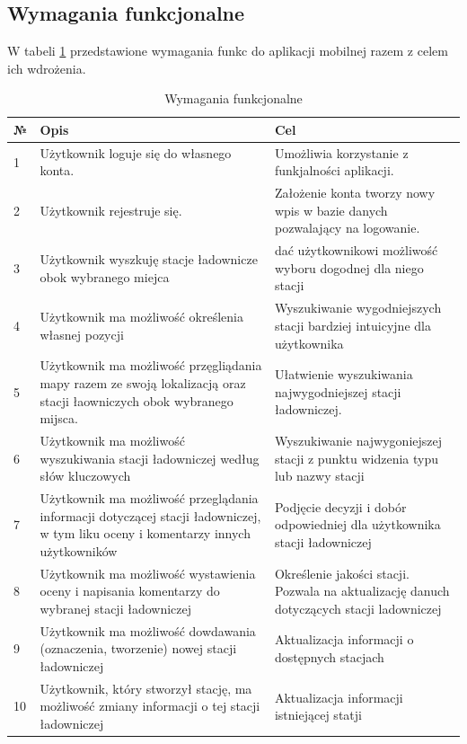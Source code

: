 \subsection{Wymagania funkcjonalne}
W tabeli \ref{tab:wymaganiafunkcjonalne} przedstawione wymagania funkc do aplikacji mobilnej razem z celem ich wdrożenia.
\begin{table}[htb] \small
    \caption{Wymagania funkcjonalne}
    \label{tab:wymaganiafunkcjonalne}
    \begin{tabular}{| m{0.5cm} | m{7cm} | m{7cm} |} 
    \hline
    № & Opis & Cel \\
    \hline
    1 & Użytkownik loguje się do własnego konta. & Umożliwia korzystanie z funkjalności aplikacji. \\ 
    \hline
    2 & Użytkownik rejestruje się. & Założenie konta tworzy nowy wpis w bazie danych pozwalający na logowanie. \\ 
    \hline
    3 & Użytkownik wyszkuję stacje ładownicze obok wybranego miejca  & dać użytkownikowi możliwość wyboru dogodnej dla niego stacji \\
    \hline
    4 & Użytkownik ma możliwość określenia własnej pozycji & Wyszukiwanie wygodniejszych stacji bardziej intuicyjne dla użytkownika  \\
    \hline
    5 & Użytkownik ma możliwość przęgliądania mapy razem ze swoją lokalizacją oraz stacji łaowniczych obok wybranego mijsca. & Ułatwienie wyszukiwania najwygodniejszej stacji ładowniczej. \\
    \hline
    6 & Użytkownik ma możliwość wyszukiwania stacji ładowniczej według słów kluczowych & Wyszukiwanie najwygoniejszej stacji z punktu widzenia typu lub nazwy stacji \\
    \hline
    7 & Użytkownik ma możliwość przeglądania informacji dotyczącej stacji ładowniczej, w tym liku oceny i komentarzy innych użytkowników & Podjęcie decyzji i dobór odpowiedniej dla użytkownika stacji ładowniczej \\
    \hline
    8 & Użytkownik ma możliwość wystawienia oceny i napisania komentarzy do wybranej stacji ładowniczej & Określenie jakości stacji. Pozwala na aktualizację danuch dotyczących stacji ladowniczej \\
    \hline
    9 & Użytkownik ma możliwość dowdawania (oznaczenia, tworzenie) nowej stacji ładowniczej & Aktualizacja informacji o dostępnych stacjach \\
    \hline
    10 & Użytkownik, który stworzył stację, ma możliwość zmiany informacji o tej stacji ładowniczej & Aktualizacja informacji istniejącej statji \\
    \hline
\end{tabular}
\end{table}
\newpage
